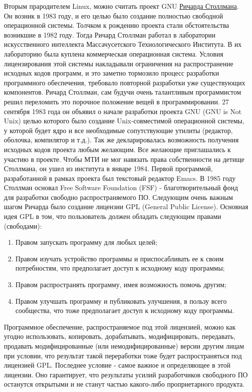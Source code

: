 \documentclass[bachelor, och, referat, times]{SCWorks}
\begin{document}
\par Вторым прародителем Linux, можно считать проект GNU \href{https://ru.wikipedia.org/wiki/\%D0\%A1\%D1\%82\%D0\%BE\%D0\%BB\%D0\%BB\%D0\%BC\%D0\%B0\%D0\%BD,\_\%D0\%A0\%D0\%B8\%D1\%87\%D0\%B0\%D1\%80\%D0\%B4\_\%D0\%9C\%D1\%8D\%D1\%82\%D1\%82\%D1\%8C\%D1\%8E}{Ричарда Столлмана}. Он возник в 1983 году, и его целью было создание полностью свободной операционной системы. Толчком к рождению проекта стали обстоятельства возникшие в 1982 году. Тогда Ричард Столлман работал в лаборатории искусственного интеллекта Массачусетского Технологического Института. В их лабораторию была куплена коммерческая операционная система. Условия лицензирования этой системы накладывали ограничения на распространение исходных кодов программ, и это заметно тормозило процесс разработки программного обеспечения, требовало повторной разработки уже существующих компонентов. Ричард Столлман, сам будучи очень талантливым программистом решил переломить это порочное положение вещей в программировании. 27 сентября 1983 года он объявил о начале разработки проекта GNU (GNU is Not Unix) целью которого было создание Unix-совместимой операционной системы, у которой будет ядро и все необходимые сопутствующие утилиты (редактор, оболочка, компилятор и т.д.). Так же декларировалась возможность получения исходных кодов проекта любым желающим. Все желающие приглашались к участию в проекте. Чтобы МТИ не мог навязать права собственности на детище Столлмана, он ушел из института в январе 1984. Первой программой, разработанной в рамках проекта был текстовый редактор Emacs. В 1985 году Столлман основал Free Software Foundation (FSF) - благотворительный фонд для разработки свободно распространяемого ПО. Следующим очень важным шагом Ричарда было создание лицензии GPL (General Public License). Основная идея GPL в том, что пользователь должен обладать следующим правами (свободами):
	\begin{enumerate}
		\item Правом запускать программу для любых целей;
		\item Правом изучать устройство программы и приспосабливать ее к своим потребностям, что 						предполагает доступ к исходному коду программы;
		\item Правом распространять программу, имея возможность помочь другим;
		\item Правом улучшать программу и публиковать улучшения, в пользу всего сообщества, что тоже 					предполагает доступ к исходному коду программы.
	\end{enumerate}
\par Программное обеспечение, распространяемое под этой лицензией, можно как угодно использовать, копировать, дорабатывать, модифицировать, передавать, продавать модифицированные (или немодифицированные) версии другим лицам при условии, что результат такой переработки тоже будет распространяться под лицензией GPL. Последнее условие - самое важное и определяющее в этой лицензии. Оно гарантирует, что результаты усилий разработчиков свободного ПО останутся открытыми и не станут частью какого-либо проприетарного продукта.
\end{document}
